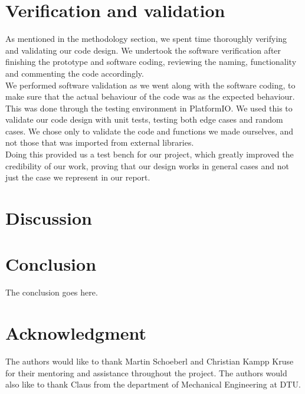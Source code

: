 \documentclass[conference]{IEEEtran}
\begin{document}
\section{Verification and validation} %
As mentioned in the methodology section, we spent time thoroughly verifying and validating our code design. We undertook the software verification after finishing the prototype and software coding, reviewing the naming, functionality and commenting the code accordingly.\\
We performed software validation as we went along with the software coding, to make sure that the actual behaviour of the code was as the expected behaviour. This was done through the testing environment in PlatformIO. We used this to validate our code design with unit tests, testing both edge cases and random cases. We chose only to validate the code and functions we made ourselves, and not those that was imported from external libraries.\\
Doing this provided us a test bench for our project, which greatly improved the credibility of our work, proving that our design works in general cases and not just the case we represent in our report.

\section{Discussion}

\section{Conclusion}
The conclusion goes here.


\section*{Acknowledgment}


The authors would like to thank Martin Schoeberl and Christian Kampp Kruse for their mentoring and assistance throughout the project. The authors would also like to thank Claus from the department of Mechanical Engineering at DTU.



\end{document}
